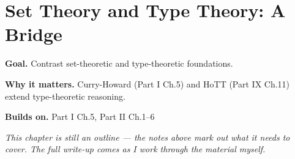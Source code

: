 \chapter{Set Theory and Type Theory: A Bridge}
\label{ch:02-set-theory-07}

\begin{chapterintro}
\textbf{Goal.} Contrast set-theoretic and type-theoretic foundations.

\textbf{Why it matters.} Curry-Howard (Part I Ch.5) and HoTT (Part IX Ch.11) extend type-theoretic reasoning.

\textbf{Builds on.} Part I Ch.5, Part II Ch.1–6
\end{chapterintro}

\textit{This chapter is still an outline --- the notes above mark out what it needs to cover. The full write-up comes as I work through the material myself.}
